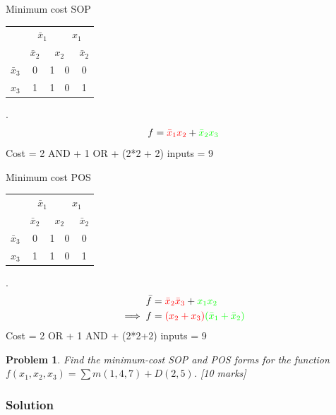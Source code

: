 \documentclass[twocolumn]{article}
\newtheorem{prob}{Problem}
\newcommand{\bx}{\bar{x}}
\newcommand{\cred}{\color{red}}
\newcommand{\cg}{\color{green}}
\begin{document}
Minimum cost SOP
\\
\begin{tabular}{c|c|c|c|c}
  \toprule
  & \multicolumn{2}{c|}{$\bx_1$} & \multicolumn{2}{c}{$x_1$}
  \\
  & $\bx_2$ & \multicolumn{2}{c|}{$x_2$} & $\bx_2$
  \\ \midrule
  $\bx_3$
                                  & 0 & {\color{red}1} & 0 & 0
  \\
  $x_3$
                                  & {\color{green}1} & {\color{red}1} & 0 & {\color{green}1}
  \\\bottomrule
\end{tabular}.
\\
\begin{align}
  f = {\cred \bx_1 x_2} + {\cg \bx_2 x_3}
\end{align}
Cost = 2 AND  + 1 OR + (2*2 + 2) inputs = 9

Minimum cost POS
\\
\begin{tabular}{c|c|c|c|c}
  \toprule
  & \multicolumn{2}{c|}{$\bx_1$} & \multicolumn{2}{c}{$x_1$}
  \\
  & $\bx_2$ & \multicolumn{2}{c|}{$x_2$} & $\bx_2$
  \\ \midrule
  $\bx_3$
  & \cred 0 & 1 & \cg 0 & \cred 0
  \\
  $x_3$
  & 1 & 1 & \cg 0 & 1
  \\\bottomrule
\end{tabular}.
\\
\begin{align}
  \bar{f} &= {\cred \bx_2 \bx_3} + {\cg x_1 x_2 }
  \\
  \implies f &= {\cred (x_2 + x_3)}{\cg (\bx_1 + \bx_2) }
\end{align}
Cost = 2 OR + 1 AND + (2*2+2) inputs = 9

\begin{prob}
Find the minimum-cost SOP and POS forms for the function $f(x_1 , x_2 , x_3) =
\sum m(1, 4, 7) + D(2, 5)$. \cite[Prob 2.38]{brown2013fundamentals} [10 marks]
\end{prob}

\subsubsection*{Solution}
\end{document}
